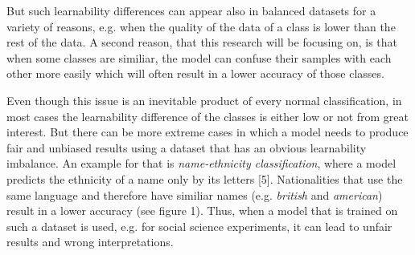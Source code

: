 \documentclass[journal]{IEEEtran}
\begin{document}

But such learnability differences can appear also in balanced datasets for a variety of reasons, e.g. when the quality of the data of a class is lower than the rest of the data. %
A second reason, that this research will be focusing on, is that when some classes are similiar, %
the model can confuse their samples with each other more easily which will often result in a lower accuracy of those classes.

Even though this issue is an inevitable product of every normal classification, in most cases the learnability difference of the classes is either low or not from great interest.
But there can be more extreme cases in which a model needs to produce fair and unbiased results using a dataset that has an obvious learnability imbalance. 
An example for that is \emph{name-ethnicity classification}, where a model predicts the ethnicity of a name only by its letters [5]. 
Nationalities that use the same language and therefore have similiar names (e.g. \emph{british} and \emph{american}) result in a lower accuracy (see figure 1).
Thus, when a model that is trained on such a dataset is used, e.g. for social science experiments, it can lead to unfair results and wrong interpretations. 
\end{document}
